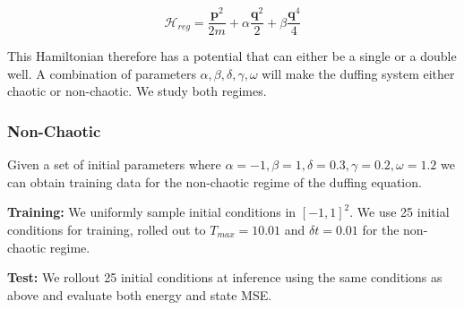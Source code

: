 \documentclass[twoside]{article}
\begin{document}
\begin{equation}
\mathcal{H}_{reg} = \frac{\mathbf{p}^2}{2m}+ \alpha \frac{\mathbf{q}^2}{2} + \beta \frac{\mathbf{q}^4}{4}
\end{equation}

This Hamiltonian therefore has a potential that can either be a single or a double well. A combination of parameters $\alpha,\beta,\delta,\gamma,\omega$ will make the duffing system either chaotic or non-chaotic. We study both regimes.

\subsubsection{Non-Chaotic}

Given a set of initial parameters where $\alpha =-1,\beta=1,\delta=0.3,\gamma=0.2,\omega=1.2$ we can obtain training data for the non-chaotic regime of the duffing equation. 

\textbf{Training:} We uniformly sample initial conditions in $[-1,1]^2$. We use 25 initial conditions for training, rolled out to $T_{max}=10.01$ and $\delta t =0.01$ for the non-chaotic regime. 

\textbf{Test:} We rollout 25 initial conditions at inference using the same conditions as above and evaluate both energy and state MSE.
\end{document}
